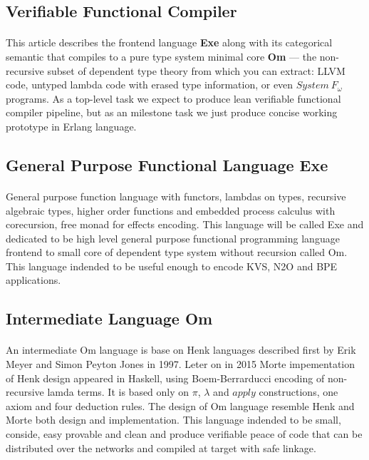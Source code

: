 \documentclass[11pt,oneside]{article}
\begin{document}
\subsection{Verifiable Functional Compiler}

   \paragraph{}
   This article describes the frontend language {\bf Exe} along with its categorical semantic
   that compiles to a pure type system minimal core {\bf Om} --- the
   non-recursive subset of dependent type theory from which you can extract: LLVM code,
   untyped lambda code with erased type information, or even $System\ F_\omega$ programs.
   As a top-level task we expect to produce lean verifiable functional compiler pipeline,
   but as an milestone task we just produce concise working prototype in Erlang language.

\subsection{General Purpose Functional Language Exe}

   \paragraph{}
   General purpose function language with functors, lambdas on types, recursive algebraic types,
   higher order functions and embedded process calculus with corecursion, free monad for effects encoding.
   This language will be called Exe and dedicated to be high level general purpose functional
   programming language frontend to small core of dependent type system without recursion called Om.
   This language indended to be useful enough to encode KVS, N2O and BPE applications.

\subsection{Intermediate Language Om}

   \paragraph{}
   An intermediate Om language is base on Henk\cite{henk} languages described first
   by Erik Meyer and Simon Peyton Jones in 1997. Leter on in 2015 Morte impementation
   of Henk design appeared in Haskell, using Boem-Berrarducci encoding of non-recursive lamda terms.
   It is based only on $\pi$, $\lambda$ and $apply$ constructions, one axiom and four deduction rules.
   The design of Om language resemble Henk and Morte both design and implementation.
   This language indended to be small, conside, easy provable and clean and produce
   verifiable peace of code that can be distributed over the networks and compiled at target with
   safe linkage.
\end{document}

